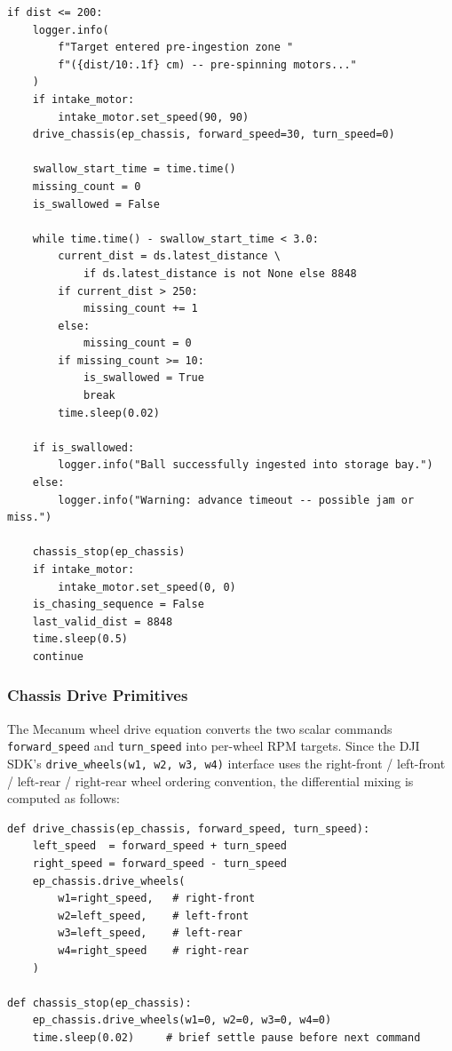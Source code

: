\begin{verbatim}
if dist <= 200:
    logger.info(
        f"Target entered pre-ingestion zone "
        f"({dist/10:.1f} cm) -- pre-spinning motors..."
    )
    if intake_motor:
        intake_motor.set_speed(90, 90)
    drive_chassis(ep_chassis, forward_speed=30, turn_speed=0)

    swallow_start_time = time.time()
    missing_count = 0
    is_swallowed = False

    while time.time() - swallow_start_time < 3.0:
        current_dist = ds.latest_distance \
            if ds.latest_distance is not None else 8848
        if current_dist > 250:
            missing_count += 1
        else:
            missing_count = 0
        if missing_count >= 10:
            is_swallowed = True
            break
        time.sleep(0.02)

    if is_swallowed:
        logger.info("Ball successfully ingested into storage bay.")
    else:
        logger.info("Warning: advance timeout -- possible jam or miss.")

    chassis_stop(ep_chassis)
    if intake_motor:
        intake_motor.set_speed(0, 0)
    is_chasing_sequence = False
    last_valid_dist = 8848
    time.sleep(0.5)
    continue
\end{verbatim}

\subsubsection{Chassis Drive Primitives}

The Mecanum wheel drive equation converts the two scalar commands \texttt{forward\_speed} and \texttt{turn\_speed}
into per-wheel RPM targets.
Since the DJI SDK's \texttt{drive\_wheels(w1, w2, w3, w4)} interface uses the
right-front / left-front / left-rear / right-rear wheel ordering convention, the differential mixing is computed as follows:

\begin{verbatim}
def drive_chassis(ep_chassis, forward_speed, turn_speed):
    left_speed  = forward_speed + turn_speed
    right_speed = forward_speed - turn_speed
    ep_chassis.drive_wheels(
        w1=right_speed,   # right-front
        w2=left_speed,    # left-front
        w3=left_speed,    # left-rear
        w4=right_speed    # right-rear
    )

def chassis_stop(ep_chassis):
    ep_chassis.drive_wheels(w1=0, w2=0, w3=0, w4=0)
    time.sleep(0.02)     # brief settle pause before next command
\end{verbatim}

